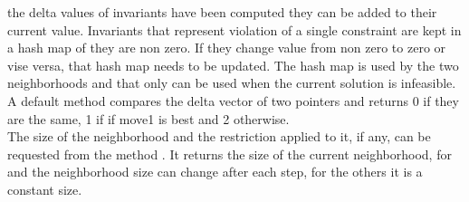 the delta values of invariants have been computed they can be added to their current value. Invariants that represent 
violation of a single constraint are kept in a hash map of they are non zero. If they change value from non zero to zero 
or vise versa, that hash map needs to be updated. The hash map is used by the two neighborhoods  
and  that only can be used when the current solution is infeasible. \\
A default method  compares the delta vector of two  pointers and returns 
0 if they are the same, 1 if if move1 is best and 2 otherwise. \\ 
The size of the neighborhood and the restriction applied to it, if any, can be requested from the 
method . It returns the size of the current neighborhood, for  and 
 the neighborhood size can change after each step, for the others it is a constant size. \\ 




